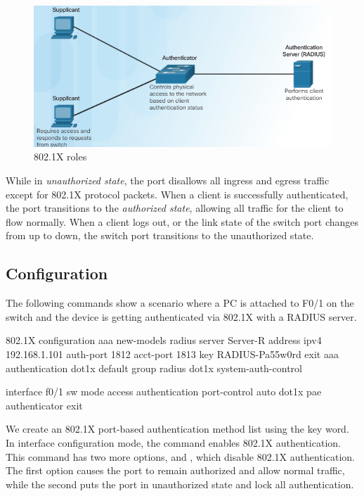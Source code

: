 \begin{figure}[hbtp]
\caption{802.1X roles}\label{802.1X}
\centering
\includegraphics[scale=0.7]{pictures/8021X.PNG}
\end{figure}


While in \emph{unauthorized state}, the port disallows all ingress and egress traffic except for 802.1X protocol packets. When a client is successfully authenticated, the port transitions to the \emph{authorized state}, allowing all traffic for the client to flow normally. When a client logs out, or the link state of the switch port changes from up to down, the switch port transitions to the unauthorized state.\\


\subsection{Configuration}

The following commands show a scenario where a PC is attached to F0/1 on the switch and the device is getting authenticated via 802.1X with a RADIUS server.

\begin{sexylisting}{802.1X configuration}
aaa new-models
radius server Server-R
  address ipv4 192.168.1.101 auth-port 1812 acct-port 1813
  key RADIUS-Pa55w0rd
  exit
aaa authentication dot1x default group radius
dot1x system-auth-control

interface f0/1
  sw mode access
  authentication port-control auto
  dot1x pae authenticator
  exit
\end{sexylisting}

We create an 802.1X port-based authentication method list using the  key word. In interface configuration mode, the  command enables 802.1X authentication. This command has two more options,  and , which disable 802.1X authentication. The first option causes the port to remain authorized and allow normal traffic, while the second puts the port in unauthorized state and lock all authentication.